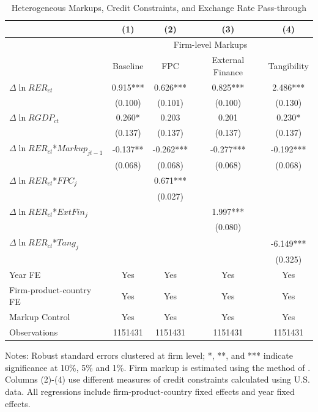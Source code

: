\documentclass[12pt]{article}
\begin{document}
\begin{table}[htbp]
	\centering
	\caption{Heterogeneous Markups, Credit Constraints, and Exchange Rate Pass-through}
	\begin{threeparttable}
		\begin{tabular}{lcccc}
			\toprule         
			& (1)   & (2)   & (3)   & (4)     \\
			\midrule
			& \multicolumn{4}{c}{Firm-level Markups}      \\
			& Baseline      & FPC & External Finance& Tangibility        \\
			\midrule
			$\Delta \ln RER_{ct}$ & 0.915*** & 0.626*** & 0.825*** & 2.486***\\
			& (0.100) & (0.101) & (0.100) & (0.130) \\
			$\Delta \ln RGDP_{ct}$ & 0.260*	& 0.203 & 0.201 & 0.230*\\
			& (0.137) & (0.137) & (0.137) & (0.137)  \\
			$\Delta \ln RER_{ct}$*$Markup_{jt-1}$ & -0.137** & -0.262*** & -0.277*** & -0.192*** \\
			& (0.068) & (0.068) & (0.068) & (0.068) \\
			$\Delta \ln RER_{ct}$*$FPC_{j}$ &       & 0.671*** &       &  \\
			&       & (0.027) &       &   \\
			$\Delta \ln RER_{ct}$*$ExtFin_{j}$ &       &       & 1.997*** &  \\
			&       &       & (0.080) &   \\
			$\Delta \ln RER_{ct}$*$Tang_{j}$  &       &       &       & -6.149*** \\
			&       &       &       & (0.325) \\
			Year FE  & Yes   & Yes   & Yes   & Yes       \\
			Firm-product-country FE & Yes   & Yes   & Yes   & Yes       \\
			Markup Control & Yes   & Yes   & Yes   & Yes       \\
			Observations & 1151431 & 1151431 & 1151431 & 1151431  \\
			\bottomrule
		\end{tabular}
		\begin{tablenotes}
			\footnotesize
			\item[Notes:] Robust standard errors clustered at firm level; *, **, and *** indicate significance at 10\%, 5\% and 1\%. Firm markup is estimated using the method of \cite{dlw2012}. Columns (2)-(4) use different measures of credit constraints calculated using U.S. data. All regressions include firm-product-country fixed effects and year fixed effects.
		\end{tablenotes}
	\end{threeparttable}
        \label{tab.markup}
\end{table}
\end{document}
